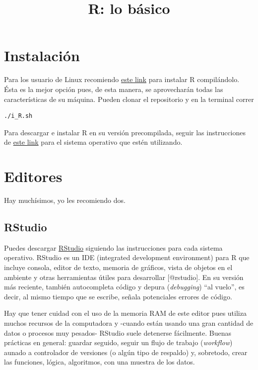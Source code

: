 \documentclass[]{article}
\title{R: lo básico}
\author{}
\date{}
\begin{document}
\section{Instalación}\label{instalacion}

Para los usuario de Linux recomiendo
\href{https://github.com/Skalas/massive-adventure-ubuntu/blob/master/i_R.sh}{este
link} para instalar R compilándolo. Ésta es la mejor opción pues, de
esta manera, se aprovecharán todas las características de su máquina.
Pueden clonar el repositorio y en la terminal correr

\begin{verbatim}
./i_R.sh
\end{verbatim}

Para descargar e instalar R en su versión precompilada, seguir las
instrucciones de \href{https://cran.r-project.org/}{este link} para el
sistema operativo que estén utilizando.

\section{Editores}\label{editores}

Hay muchísimos, yo les recomiendo dos.

\subsection{RStudio}\label{rstudio}

Puedes descargar
\href{https://www.rstudio.com/products/rstudio/download/}{RStudio}
siguiendo las instrucciones para cada sistema operativo. RStudio es un
IDE (integrated development environment) para R que incluye consola,
editor de texto, memoria de gráficos, vista de objetos en el ambiente y
otras herramientas útiles para desarrollar {[}@rstudio{]}. En su versión
más reciente, también autocompleta código y depura (\emph{debugging})
``al vuelo'', es decir, al mismo tiempo que se escribe, señala
potenciales errores de código.

Hay que tener cuidad con el uso de la memoria RAM de este editor pues
utiliza muchos recursos de la computadora y -cuando están usando una
gran cantidad de datos o procesos muy pesados- RStudio suele detenerse
fácilmente. Buenas prácticas en general: guardar seguido, seguir un
flujo de trabajo (\emph{workflow}) aunado a controlador de versiones (o
algún tipo de respaldo) y, sobretodo, crear las funciones, lógica,
algoritmos, con una muestra de los datos.
\end{document}
